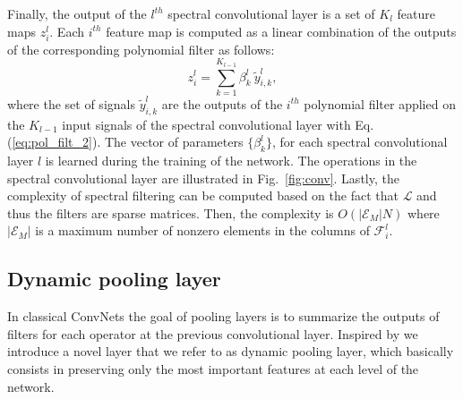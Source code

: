 \documentclass[10pt,journal,compsoc]{IEEEtran}
\begin{document}

	Finally, the output of the $l^{th}$ spectral convolutional layer is a set of $K_{l}$ feature maps $z_i^{l}$. Each $i^{th}$ feature map is computed as a linear combination of the outputs of the corresponding polynomial filter as follows: %
	\begin{equation}
	z_i^{l} =  \sum_{k=1}^{K_{l-1}} \beta_{k}^{l} \ \tilde{y}_{i,k}^{l} ,
	\label{eq:lincomb}
	\end{equation}
	\noindent
	where the set of signals $\tilde{y}_{i,k}^{l}$ are the outputs of the $i^{th}$ polynomial filter applied on the $K_{l-1}$ input signals of the spectral convolutional layer with Eq. (\ref{eq:pol_filt_2}). The vector of parameters $\{\beta_{k}^{l}\}$, for each spectral convolutional layer $l$ is learned during the training of the network. The operations in the spectral convolutional layer are illustrated in Fig.~\ref{fig:conv}. Lastly, the complexity of spectral filtering can be computed based on the fact that $\mathcal{L}$ and thus the filters are sparse matrices. Then, the complexity is $O(|\mathcal{E}_M | N)$ where $|\mathcal{E}_M|$ is a maximum number of nonzero elements in the columns of $\mathcal{F}_i^{l}$.


	\subsection{Dynamic pooling layer}
	\label{s:pool}

	In classical ConvNets the goal of pooling layers is to summarize the outputs of filters for each operator at the previous convolutional layer. Inspired by \cite{bb:dmaxpool} we introduce a novel layer that we refer to as dynamic pooling layer, which basically consists in preserving only the most important features at each level of the network.
\end{document}
